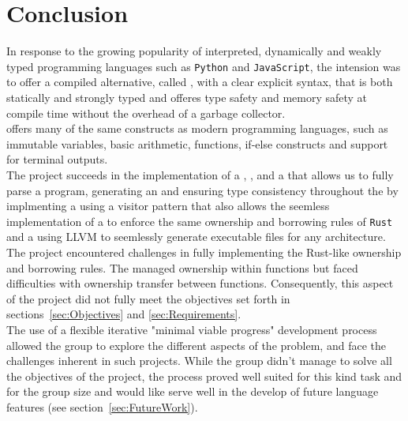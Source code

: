 \section{Conclusion}
\label{sec:conclusion}

In response to the growing popularity of interpreted, dynamically and weakly typed programming
languages such as \texttt{Python} and \texttt{JavaScript}, the intension was to offer
a compiled alternative, called \lang, with a clear explicit syntax, that is both statically and strongly
typed and offeres type safety and memory safety at compile time without the overhead
of a garbage collector. \\ 

\lang{} offers many of the same constructs as modern programming languages,
such as immutable variables, basic arithmetic, functions, if-else constructs and
support for terminal outputs. \\

The project succeeds in the implementation of a \lexer{}, \parser{}, 
\typeChecker{} and a \codeGen{} that allows us to fully parse a \lang{} program,
generating an \ast{} and ensuring type consistency throughout the \ast{} by
implmenting a \typeChecker{} using a visitor pattern that also allows the seemless
implementation of a \borrowChecker{} to enforce the same ownership and borrowing
rules of \texttt{Rust} and a \codeGen{} using LLVM to seemlessly generate executable
files for any architecture. \\

The project encountered challenges in fully implementing the Rust-like
ownership and borrowing rules.
The \borrowChecker{} managed ownership within functions but faced difficulties with
ownership transfer between functions. Consequently, this aspect of the project did
not fully meet the objectives set forth in sections~\ref{sec:Objectives} and
\ref{sec:Requirements}. \\

The use of a flexible iterative "minimal viable progress" development process allowed
the group to explore the different aspects of the problem, and face the challenges
inherent in such projects. While the group didn't manage to solve all the objectives
of the project, the process proved well suited for this kind task and for the group
size and would like serve well in the develop of future language features (see
section~\ref{sec:FutureWork}).

\newpage
